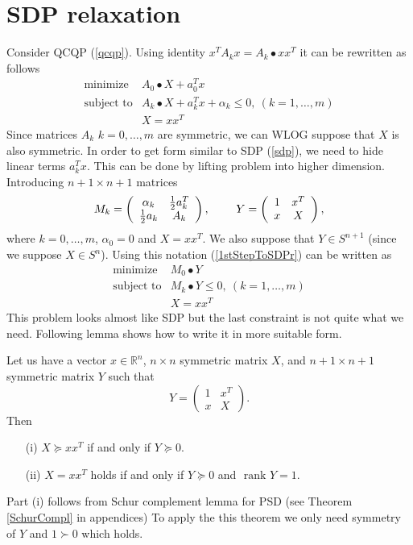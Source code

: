 \documentclass[10pt,oneside]{book}
\theoremstyle{definition}
\begin{document}
\section{SDP relaxation}
Consider QCQP (\ref{qcqp}). Using identity $x^TA_kx = A_k\bullet xx^T$ it can be rewritten as follows
\begin{equation} 
\label{1stStepToSDPr}
\begin{array}{ll}
\mbox{minimize}& A_0\bullet X + a_0^Tx \\
\mbox{subject to}& A_k\bullet X+ a_k^Tx + \alpha_k \leq 0, \  (k = 1,\dots ,m)\\
& X = xx^T
\end{array} 
\end{equation}
Since matrices $A_k$ $k=0,\dots, m$ are symmetric, we can WLOG suppose that $X$ is also symmetric. In order to get form similar to SDP (\ref{sdp}), we need to hide linear terms $a_k^Tx$. This can be done by lifting problem into higher dimension. Introducing $n+1\times n+1$ matrices
$$M_k = \left(
\begin{array}{cc}
\alpha_k & {1\over 2}a_k^T \\
{1\over 2}a_k & A_k
\end{array}\right), 
\ \ \ \ \ \ \
Y =  \left(
\begin{array}{cc}
1 & x^T \\
x & X
\end{array}\right), 
$$
where $k=0,\dots ,m$, $\alpha_0=0$ and $X=xx^T$. We also suppose that $Y\in S^{n+1}$ (since we suppose $X\in S^n$).  Using this notation (\ref{1stStepToSDPr}) can be written as
\begin{equation} 
\label{2ndStepToSDPr}
\begin{array}{ll}
\mbox{minimize}& M_0\bullet Y \\
\mbox{subject to}& M_k\bullet Y \leq 0, \  (k = 1,\dots ,m)\\
& X = xx^T
\end{array} 
\end{equation}
This problem looks almost like SDP but the last constraint is not quite what we need. Following lemma shows how to write it in more suitable form.

\lema Let us have a vector $x\in \mathbb{R}^n$, $n\times n$ symmetric matrix $X$, and $n+1\times n+1$ symmetric matrix $Y$ such that 
$$Y =  \left(
\begin{array}{cc}
1 & x^T \\
x & X
\end{array}\right). 
$$  Then
\begin{itemize}
\item[(i)] $X\succeq xx^T$ if and only if $Y\succeq 0$.
\item[(ii)] $X=xx^T$ holds if and only if $Y\succeq 0$ and \rm $\mbox{ rank } Y=1$. 
\end{itemize}
\proof Part (i) follows from Schur complement lemma for PSD (see Theorem \ref{SchurCompl} in appendices) To apply the this theorem we only need symmetry of $Y$ and $1\succ 0$ which holds. 
\end{document}
